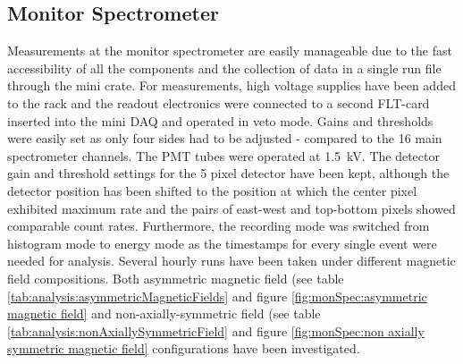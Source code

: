   \subsection{Monitor Spectrometer}
  \label{ch:Analysis:sec:Monitor Spectrometer Measurements:subsec:Monitor Spectrometer}
  
  Measurements at the monitor spectrometer are easily manageable due to the fast accessibility of all the components and the collection of data in a single run file through the mini crate.
  For measurements, high voltage supplies have been added to the  rack and the readout electronics were connected to a second FLT-card inserted into the mini DAQ and operated in veto mode. Gains and thresholds were easily set as only four sides had to be adjusted - compared to the 16 main spectrometer channels. The PMT tubes were operated at \SI{1.5}{\kilo\volt}. The detector gain and threshold settings for the 5 pixel detector have been kept, although the detector position has been shifted to the position at which the center pixel exhibited maximum rate and the pairs of east-west and top-bottom pixels showed comparable count rates. Furthermore, the recording mode was switched from histogram mode to energy mode as the timestamps for every single event were needed for analysis. 
  Several hourly runs have been taken under different magnetic field compositions. Both asymmetric magnetic field (see table \ref{tab:analysis:asymmetricMagneticFields} and figure \ref{fig:monSpec:asymmetric magnetic field} and non-axially-symmetric field (see table \ref{tab:analysis:nonAxiallySymmetricField} and figure \ref{fig:monSpec:non axially symmetric magnetic field} configurations have been investigated. \todo{}
